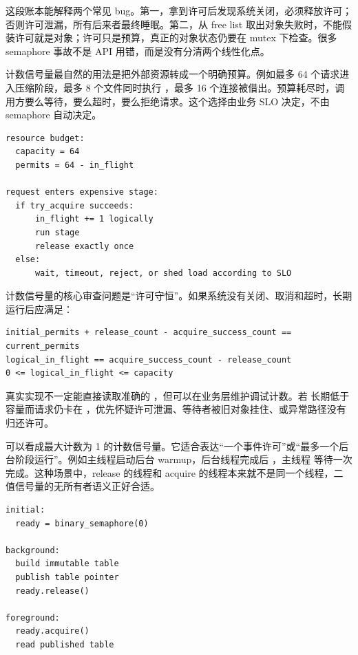 这段账本能解释两个常见 bug。第一，拿到许可后发现系统关闭，必须释放许可；否则许可泄漏，所有后来者最终睡眠。第二，从 free list 取出对象失败时，不能假装许可就是对象；许可只是预算，真正的对象状态仍要在 mutex 下检查。很多 semaphore 事故不是  API 用错，而是没有分清两个线性化点。

计数信号量最自然的用法是把外部资源转成一个明确预算。例如最多 64 个请求进入压缩阶段，最多 8 个文件同时执行 ，最多 16 个连接被借出。预算耗尽时，调用方要么等待，要么超时，要么拒绝请求。这个选择由业务 SLO 决定，不由 semaphore 自动决定。

\begin{lstlisting}[numbers=none,caption={计数信号量的资源预算账本}]
resource budget:
  capacity = 64
  permits = 64 - in_flight

request enters expensive stage:
  if try_acquire succeeds:
      in_flight += 1 logically
      run stage
      release exactly once
  else:
      wait, timeout, reject, or shed load according to SLO
\end{lstlisting}

计数信号量的核心审查问题是“许可守恒”。如果系统没有关闭、取消和超时，长期运行后应满足：

\begin{lstlisting}[numbers=none,caption={许可守恒检查}]
initial_permits + release_count - acquire_success_count == current_permits
logical_in_flight == acquire_success_count - release_count
0 <= logical_in_flight <= capacity
\end{lstlisting}

真实实现不一定能直接读取准确的 ，但可以在业务层维护调试计数。若  长期低于容量而请求仍卡在 ，优先怀疑许可泄漏、等待者被旧对象挂住、或异常路径没有归还许可。

 可以看成最大计数为 1 的计数信号量。它适合表达“一个事件许可”或“最多一个后台阶段运行”。例如主线程启动后台 warmup，后台线程完成后 ，主线程  等待一次完成。这种场景中，release 的线程和 acquire 的线程本来就不是同一个线程，二值信号量的无所有者语义正好合适。

\begin{lstlisting}[numbers=none,caption={binary semaphore 适合一次完成信号}]
initial:
  ready = binary_semaphore(0)

background:
  build immutable table
  publish table pointer
  ready.release()

foreground:
  ready.acquire()
  read published table
\end{lstlisting}

